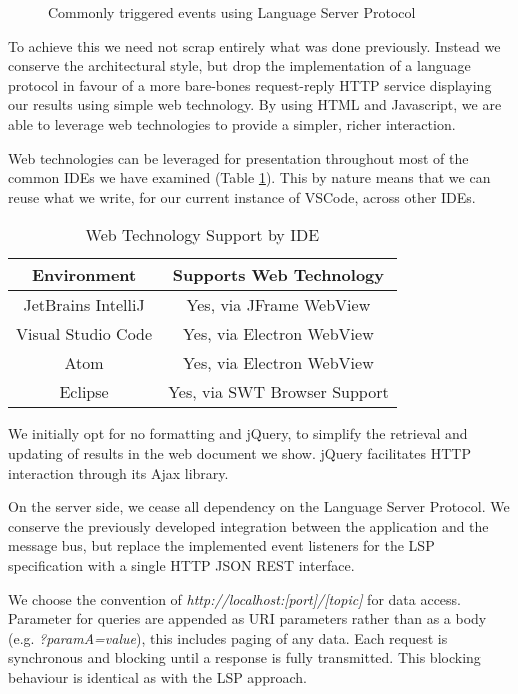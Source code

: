 \begin{figure}[h!]
	\centering
	\caption{Commonly triggered events using Language Server Protocol}
	\label{fig:commonLSPEvents}
\end{figure}

To achieve this we need not scrap entirely what was done previously. Instead we conserve the architectural style, but drop the implementation of a language protocol in favour of a more bare-bones request-reply HTTP service displaying our results using simple web technology. By using HTML and Javascript, we are able to leverage web technologies to provide a simpler, richer interaction. 

Web technologies can be leveraged for presentation throughout most of the common IDEs we have examined (Table \ref{table:webviewSupportByIDE}). This by nature means that we can reuse what we write, for our current instance of VSCode, across other IDEs.

\begin{table}[h!]
	\centering
	\begin{tabular}{|c|c|}
		\hline 
		Environment & Supports Web Technology \\ 
		\hline 
		\hline 
		JetBrains IntelliJ & Yes, via JFrame WebView \\ 
		\hline 
		Visual Studio Code & Yes, via Electron WebView  \\ 
		\hline 
		Atom & Yes, via Electron WebView  \\ 
		\hline 
		Eclipse & Yes, via SWT Browser Support \\ 
		\hline 
	\end{tabular} 
	\caption{Web Technology Support by IDE}
	\label{table:webviewSupportByIDE}
\end{table}

We initially opt for no formatting and jQuery, to simplify the retrieval and updating of results in the web document we show. jQuery facilitates HTTP interaction through its Ajax library. 

On the server side, we cease all dependency on the Language Server Protocol. We conserve the previously developed integration between the application and the message bus, but replace the implemented event listeners for the LSP specification with a single HTTP JSON REST interface. 

We choose the convention of \textit{http://localhost:[port]/[topic]} for data access. Parameter for queries are appended as URI parameters rather than as a body (e.g. \textit{?paramA=value}), this includes paging of any data. Each request is synchronous and blocking until a response is fully transmitted. This blocking behaviour is identical as with the LSP approach.

